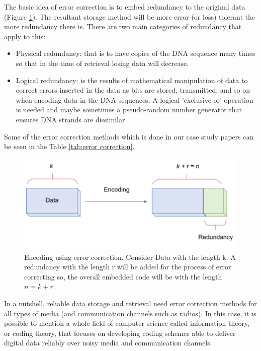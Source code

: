 \documentclass[10pt,twocolumn,twoside]{gsajnl}
\theoremstyle{definition}
\begin{document}
The basic idea of error correction is to embed redundancy to the original data (Figure \ref{fig4}). The resultant storage method will be more error (or loss) tolerant the more redundancy there is. There are two main categories of redundancy that apply to this:
\begin{itemize}
    \item Physical redundancy: that is to have copies of the DNA sequence many times so that in the time of retrieval losing data will decrease.
    \item Logical redundancy: is the results of mathematical manipulation of data to correct errors inserted in the data as bits are stored, transmitted, and so on when encoding data in the DNA sequences. A logical 'exclusive-or' operation is needed and maybe sometimes a pseudo-random number generator that ensures DNA strands are dissimilar.
\end{itemize}

Some of the error correction methods which is done in our case study papers can be seen in the Table \ref{tab:error correction}.

\begin{figure}[ht]
    \centering
    \includegraphics[width=\linewidth]{Figures/encoding.png}
    \caption{Encoding using error correction. Consider Data with the length k. A redundancy with the length r will be added for the process of error correcting so, the overall embedded code will be with the length $n=k+r$}
    \label{fig4}
\end{figure}

In a nutshell, reliable data storage and retrieval need error correction methods for all types of media (and communication channels such as radios). In this case, it is possible to mention a whole field of computer science called information theory, or coding theory, that focuses on developing coding schemes able to deliver digital data reliably over noisy media and communication channels.
\end{document}
